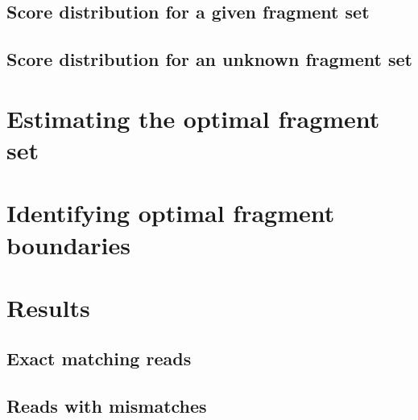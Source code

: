 \subsection{Score distribution for a given fragment set}

\subsection{Score distribution for an unknown fragment set}


\section{Estimating the optimal fragment set}


\section{Identifying optimal fragment boundaries}


\section{Results}

\subsection{Exact matching reads}

\subsection{Reads with mismatches}
